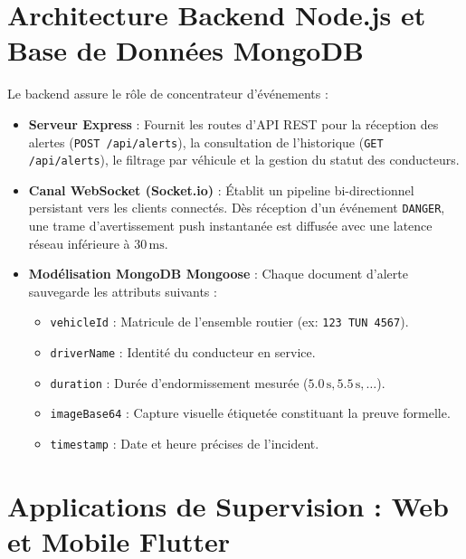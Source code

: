 \documentclass[11pt,a4paper]{article}
\begin{document}
\section{Architecture Backend Node.js et Base de Données MongoDB}

Le backend assure le rôle de concentrateur d'événements :
\begin{itemize}
    \item \textbf{Serveur Express} : Fournit les routes d'API REST pour la réception des alertes (\texttt{POST /api/alerts}), la consultation de l'historique (\texttt{GET /api/alerts}), le filtrage par véhicule et la gestion du statut des conducteurs.
    \item \textbf{Canal WebSocket (Socket.io)} : Établit un pipeline bi-directionnel persistant vers les clients connectés. Dès réception d'un événement \texttt{DANGER}, une trame d'avertissement push instantanée est diffusée avec une latence réseau inférieure à $30\,\text{ms}$.
    \item \textbf{Modélisation MongoDB Mongoose} : Chaque document d'alerte sauvegarde les attributs suivants :
    \begin{itemize}
        \item \texttt{vehicleId} : Matricule de l'ensemble routier (ex: \texttt{123 TUN 4567}).
        \item \texttt{driverName} : Identité du conducteur en service.
        \item \texttt{duration} : Durée d'endormissement mesurée ($5.0\,\text{s}, 5.5\,\text{s}, \dots$).
        \item \texttt{imageBase64} : Capture visuelle étiquetée constituant la preuve formelle.
        \item \texttt{timestamp} : Date et heure précises de l'incident.
    \end{itemize}
\end{itemize}

\section{Applications de Supervision : Web et Mobile Flutter}
\end{document}
